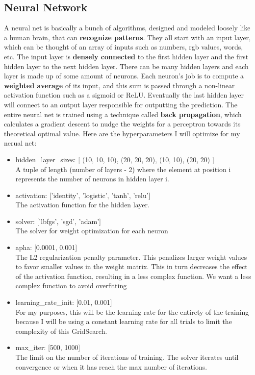 \documentclass[12pt]{article}
\begin{document}
\subsection{Neural Network}
A neural net is basically a bunch of algorithms, designed and modeled loosely like a human brain, that can \textbf{recognize patterns}. They all start with an input layer, which can be thought of an array of inputs such as numbers, rgb values, words, etc. The input layer is \textbf{densely connected} to the first hidden layer and the first hidden layer to the next hidden layer. There can be many hidden layers and each layer is made up of some amount of neurons. Each neuron's job is to compute a \textbf{weighted average} of its input, and this sum is passed through a non-linear activation function such as a sigmoid or ReLU. Eventually the last hidden layer will connect to an output layer responsible for outputting the prediction. The entire neural net is trained using a technique called \textbf{back propagation}, which calculates a gradient descent to nudge the weights for a perceptron towards its theoretical optimal value. Here are the hyperparameters I will optimize for my nerual net:
\begin{itemize}
    \item hidden\_layer\_sizes: [ (10, 10, 10), (20, 20, 20), (10, 10), (20, 20) ]
    \\ A tuple of length (number of layers - 2) where the element at position i represents the number of neurons in hidden layer i.
    \item activation: ['identity', 'logistic', 'tanh', 'relu']
    \\ The activation function for the hidden layer.
    \item solver: ['lbfgs', 'sgd', 'adam']
    \\ The solver for weight optimization for each neuron
    \item apha: [0.0001, 0.001]
    \\ The L2 regularization penalty parameter. This penalizes larger weight values to favor smaller values in the weight matrix. This in turn decreases the effect of the activation function, resulting in a less complex function. We want a less complex function to avoid overfitting
    \item learning\_rate\_init: [0.01, 0.001]
    \\ For my purposes, this will be the learning rate for the entirety of the training because I will be using a constant learning rate for all trials to limit the complexity of this GridSearch.
    \item max\_iter: [500, 1000] \rightarrow [2000, 3000]
    \\ The limit on the number of iterations of training. The solver iterates until convergence or when it has reach the max number of iterations.
\end{itemize}
\end{document}
